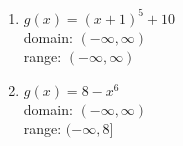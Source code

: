 \documentclass{ximera}
\begin{document}
\begin{enumerate}

\setcounter{enumi}{\value{HW}}
\item $g(x) = (x+1)^5+10$\\
domain: $(-\infty, \infty)$\\
range: $(-\infty, \infty)$\\

%
%

\vfill


\item $g(x) = 8-x^{6}$\\
domain: $(-\infty, \infty)$\\
range: $(-\infty, 8]$\\

%


\setcounter{HW}{\value{enumi}}
\end{enumerate}
\end{document}
